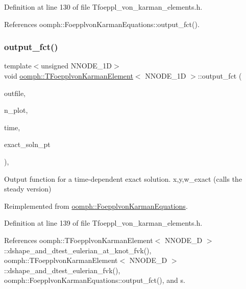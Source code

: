 Definition at line 130 of file Tfoeppl\+\_\+von\+\_\+karman\+\_\+elements.\+h.



References oomph\+::\+Foepplvon\+Karman\+Equations\+::output\+\_\+fct().

\mbox{\label{classoomph_1_1TFoepplvonKarmanElement_a742ba8001f20e4c5237d4474c9f1a67b}} 
\subsubsection{\texorpdfstring{output\+\_\+fct()}{output\_fct()}\hspace{0.1cm}{\footnotesize\ttfamily [2/2]}}
{\footnotesize\ttfamily template$<$unsigned N\+N\+O\+D\+E\+\_\+1D$>$ \\
void \hyperlink{classoomph_1_1TFoepplvonKarmanElement}{oomph\+::\+T\+Foepplvon\+Karman\+Element}$<$ N\+N\+O\+D\+E\+\_\+1D $>$\+::output\+\_\+fct (\begin{DoxyParamCaption}\item[{std\+::ostream \&}]{outfile,  }\item[{const unsigned \&}]{n\+\_\+plot,  }\item[{const double \&}]{time,  }\item[{\hyperlink{classoomph_1_1FiniteElement_ad4ecf2b61b158a4b4d351a60d23c633e}{Finite\+Element\+::\+Unsteady\+Exact\+Solution\+Fct\+Pt}}]{exact\+\_\+soln\+\_\+pt }\end{DoxyParamCaption})\hspace{0.3cm}{\ttfamily [inline]}, {\ttfamily [virtual]}}



Output function for a time-\/dependent exact solution. x,y,w\+\_\+exact (calls the steady version) 



Reimplemented from \hyperlink{classoomph_1_1FoepplvonKarmanEquations_a3eecb6536ce104ef6fbf3602b306bd37}{oomph\+::\+Foepplvon\+Karman\+Equations}.



Definition at line 139 of file Tfoeppl\+\_\+von\+\_\+karman\+\_\+elements.\+h.



References oomph\+::\+T\+Foepplvon\+Karman\+Element$<$ N\+N\+O\+D\+E\+\_\+D $>$\+::dshape\+\_\+and\+\_\+dtest\+\_\+eulerian\+\_\+at\+\_\+knot\+\_\+fvk(), oomph\+::\+T\+Foepplvon\+Karman\+Element$<$ N\+N\+O\+D\+E\+\_\+D $>$\+::dshape\+\_\+and\+\_\+dtest\+\_\+eulerian\+\_\+fvk(), oomph\+::\+Foepplvon\+Karman\+Equations\+::output\+\_\+fct(), and s.

